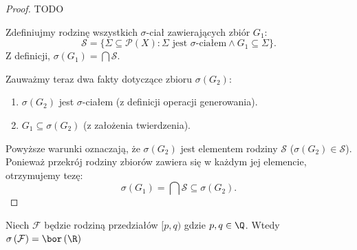 \begin{proof}

    TODO

    Zdefiniujmy rodzinę wszystkich $\sigma$-ciał zawierających zbiór $G_1$:
    \[
        \mathcal{S} = \{ \Sigma \subseteq \mathcal{P}(X) : \Sigma \text{ jest } \sigma\text{-ciałem} \land G_1 \subseteq \Sigma \}.
    \]
    Z definicji, $\sigma(G_1) = \bigcap \mathcal{S}$.
    
    Zauważmy teraz dwa fakty dotyczące zbioru $\sigma(G_2)$:
    \begin{enumerate}
        \item $\sigma(G_2)$ jest $\sigma$-ciałem (z definicji operacji generowania).
        \item $G_1 \subseteq \sigma(G_2)$ (z założenia twierdzenia).
    \end{enumerate}
    
    Powyższe warunki oznaczają, że $\sigma(G_2)$ jest elementem rodziny $\mathcal{S}$ ($\sigma(G_2) \in \mathcal{S}$).
    Ponieważ przekrój rodziny zbiorów zawiera się w każdym jej elemencie, otrzymujemy tezę:
    \[
        \sigma(G_1) = \bigcap \mathcal{S} \subseteq \sigma(G_2).
    \]
\end{proof}
\begin{lemma}
	Niech $\mathcal{F}$ będzie rodziną przedziałów $[p,q)$ gdzie $p,q\in \Q$. Wtedy $\sigma\left( \mathcal{F} \right) = \bor\left(\R\right) $
\end{lemma} 

